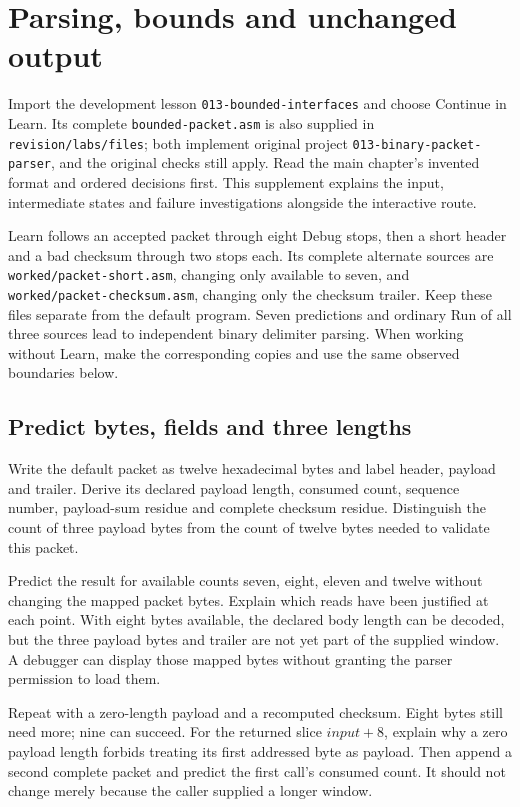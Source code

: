 \chapter{Parsing, bounds and unchanged output}
\label{revision-lab:bounded-interfaces}

Import the development lesson \texttt{013-bounded-interfaces} and choose
Continue in Learn. Its complete \texttt{bounded-packet.asm} is also supplied in
\texttt{revision/labs/files}; both implement original project
\texttt{013-binary-packet-parser}, and the original checks still apply. Read the
main chapter's invented format and ordered decisions first. This supplement
explains the input, intermediate states and failure investigations alongside
the interactive route.

Learn follows an accepted packet through eight Debug stops, then a short header
and a bad checksum through two stops each. Its complete alternate sources are
\texttt{worked/packet-short.asm}, changing only available to seven, and
\texttt{worked/packet-checksum.asm}, changing only the checksum trailer. Keep
these files separate from the default program. Seven predictions and ordinary
Run of all three sources lead to independent binary delimiter parsing. When
working without Learn, make the corresponding copies and use the same observed
boundaries below.

\section{Predict bytes, fields and three lengths}

Write the default packet as twelve hexadecimal bytes and label header, payload
and trailer. Derive its declared payload length, consumed count, sequence number,
payload-sum residue and complete checksum residue. Distinguish the count of three
payload bytes from the count of twelve bytes needed to validate this packet.

Predict the result for available counts seven, eight, eleven and twelve without
changing the mapped packet bytes. Explain which reads have been justified at each
point. With eight bytes available, the declared body length can be decoded, but
the three payload bytes and trailer are not yet part of the supplied window.
A debugger can display those mapped bytes without granting the parser permission
to load them.

Repeat with a zero-length payload and a recomputed checksum. Eight bytes still
need more; nine can succeed. For the returned slice $input+8$, explain why a zero
payload length forbids treating its first addressed byte as payload. Then append
a second complete packet and predict the first call's consumed count. It should
not change merely because the caller supplied a longer window.

